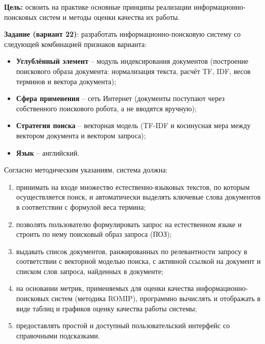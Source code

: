 
\textbf{Цель:} освоить на практике основные принципы реализации
информационно-поисковых систем и методы оценки качества их работы.

\vspace{1em}

\textbf{Задание (вариант 22)}: разработать информационно-поисковую систему
со следующей комбинацией признаков варианта:
\begin{itemize}
  \item \textbf{Углублённый элемент} -- модуль индексирования документов
  (построение поискового образа документа: нормализация текста, расчёт
  TF, IDF, весов терминов и вектора документа);
  \item \textbf{Сфера применения} -- сеть Интернет (документы поступают
  через собственного поискового робота, а не вводятся вручную);
  \item \textbf{Стратегия поиска} -- векторная модель (TF-IDF и косинусная
  мера между вектором документа и вектором запроса);
  \item \textbf{Язык} -- английский.
\end{itemize}

\vspace{1em}

Согласно методическим указаниям, система должна:
\begin{enumerate}
  \item принимать на входе множество естественно-языковых текстов, по
  которым осуществляется поиск, и автоматически выделять ключевые слова
  документов в соответствии с формулой веса термина;
  \item позволять пользователю формулировать запрос на естественном языке
  и строить по нему поисковый образ запроса (ПОЗ);
  \item выдавать список документов, ранжированных по релевантности
  запросу в соответствии с векторной моделью поиска, с активной ссылкой
  на документ и списком слов запроса, найденных в документе;
  \item на основании метрик, применяемых для оценки качества
  информационно-поисковых систем (методика ROMIP), программно вычислять
  и отображать в виде таблиц и графиков оценку качества работы системы;
  \item предоставлять простой и доступный пользовательский интерфейс со
  справочными подсказками.
\end{enumerate}
